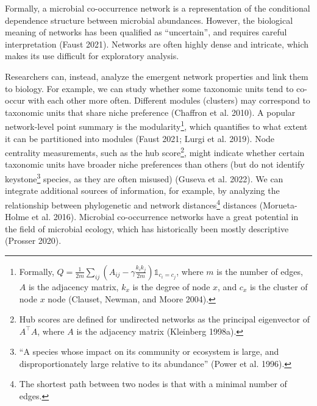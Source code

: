 \documentclass[
  a4paper,
]{article}
\begin{document}
Formally, a microbial co-occurrence network is a representation of the
conditional dependence structure between microbial abundances. However,
the biological meaning of networks has been qualified as ``uncertain'',
and requires careful interpretation (Faust 2021). Networks are often
highly dense and intricate, which makes its use difficult for
exploratory analysis.

Researchers can, instead, analyze the emergent network properties and
link them to biology. For example, we can study whether some taxonomic
units tend to co-occur with each other more often. Different modules
(clusters) may correspond to taxonomic units that share niche preference
(Chaffron et al. 2010). A popular network-level point summary is the
modularity\footnote{Formally,
  \(Q = \frac{1}{2m}\sum_{ij}\left( A_{ij} - \gamma \frac{k_ik_j}{2m}\right )\mathbb1_{c_i = c_j}\),
  where \(m\) is the number of edges, \(A\) is the adjacency matrix,
  \(k_x\) is the degree of node \(x\), and \(c_x\) is the cluster of
  node \(x\) node (Clauset, Newman, and Moore 2004).}, which quantifies
to what extent it can be partitioned into modules (Faust 2021; Lurgi et
al. 2019). Node centrality measurements, such as the hub
score\footnote{Hub scores are defined for undirected networks as the
  principal eigenvector of \(A^\top A\), where \(A\) is the adjacency
  matrix (Kleinberg 1998a).}, might indicate whether certain taxonomic
units have broader niche preferences than others (but do not identify
keystone\footnote{``A species whose impact on its community or ecosystem
  is large, and disproportionately large relative to its abundance''
  (Power et al. 1996).} species, as they are often misused) (Guseva et
al. 2022). We can integrate additional sources of information, for
example, by analyzing the relationship between phylogenetic and network
distances\footnote{The shortest path between two nodes is that with a
  minimal number of edges.} distances (Morueta-Holme et al. 2016).
Microbial co-occurrence networks have a great potential in the field of
microbial ecology, which has historically been mostly descriptive
(Prosser 2020).
\end{document}
